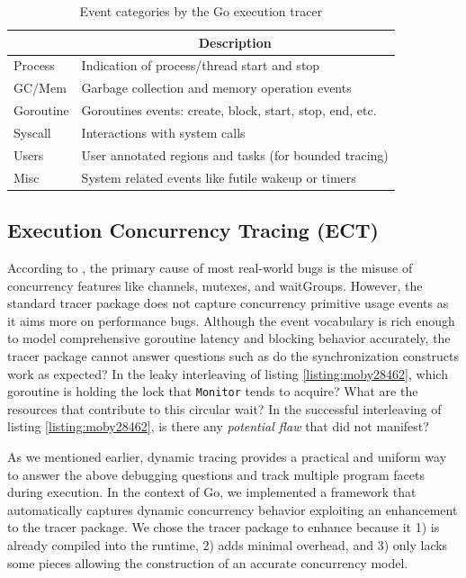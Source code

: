 \begin{table}[b]
    \centering
        \begin{tabular}{|l|l|}
        \hline
        \rowcolor[HTML]{C0C0C0}
        \multicolumn{1}{|c|}{\cellcolor[HTML]{C0C0C0}\textbf{Category}} & \multicolumn{1}{c|}{\cellcolor[HTML]{C0C0C0}\textbf{Description}} \\ \hline
        Process & Indication of process/thread start and stop \\ \hline
        GC/Mem & Garbage collection and memory operation events\\ \hline
        Goroutine & Goroutines events: create, block, start, stop, end, etc. \\ \hline
        Syscall & Interactions with system calls \\ \hline
        Users & User annotated regions and tasks (for bounded tracing) \\ \hline
        Misc & System related events like futile wakeup or timers \\ \hline
        \end{tabular}

    \caption{Event categories by the Go execution tracer}
    \label{tab:events}
\end{table}




\subsection{Execution Concurrency Tracing (ECT)}
\label{sec:ect}
According to \cite{tu-concurrentBugs-asplos19,yuan-gobench-cgo21}, the primary cause of most real-world bugs is the misuse of concurrency features like channels, mutexes, and waitGroups.
%
However, the standard tracer package does not capture concurrency primitive usage events as it aims more on performance bugs.
%
Although the event vocabulary is rich enough to model comprehensive goroutine latency and blocking behavior accurately, the tracer package cannot answer questions such as do the synchronization constructs work as expected? In the leaky interleaving of listing \ref{listing:moby28462}, which goroutine is holding the lock that \texttt{Monitor} tends to acquire? What are the resources that contribute to this circular wait? In the successful interleaving of listing \ref{listing:moby28462}, is there any \textit{potential flaw} that did not manifest?

%
As we mentioned earlier, dynamic tracing provides a practical and uniform way to answer the above debugging questions and track multiple program facets during execution.
%
In the context of Go, we implemented a framework that automatically captures dynamic concurrency behavior exploiting an enhancement to the tracer package.
%
We chose the tracer package to enhance because it 1) is already compiled into the runtime, 2) adds minimal overhead, and 3) only lacks some pieces allowing the construction of an accurate concurrency model.
%

